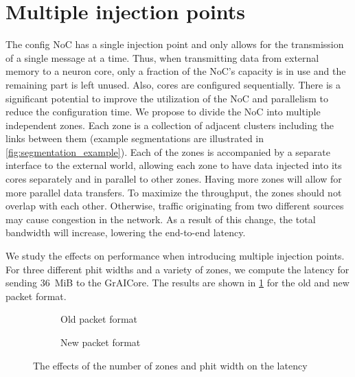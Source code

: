 \section{Multiple injection points}
The config NoC has a single injection point and only allows for the transmission of a single message at a time.
Thus, when transmitting data from external memory to a neuron core, only a fraction of the NoC's capacity is in use and the remaining part  is left unused.
Also, cores are configured sequentially.
There is a significant potential to improve the utilization of the NoC and parallelism to reduce the configuration time.
We propose to divide the NoC into multiple independent zones.
Each zone is a collection of adjacent clusters including the links between them (example segmentations are illustrated in \cref{fig:segmentation_example}).
Each of the zones is accompanied by a separate interface to the external world, allowing each zone to have data injected into its cores separately and in parallel to other zones.
Having more zones will allow for more parallel data transfers.
To maximize the throughput, the zones should not overlap with each other.
Otherwise, traffic originating from two different sources may cause congestion in the network. 
As a result of this change, the total bandwidth will increase, lowering the end-to-end latency.

We study the effects on performance when introducing multiple injection points.
For three different phit widths and a variety of zones, we compute the latency for sending \SI{36}{MiB} to the GrAICore.
The results are shown in \cref{fig:zones_vs_latency_vs_phit_width} for the old and new packet format.

\begin{figure}[htbp]
    \centering
    \begin{subfigure}[b]{0.48\textwidth}
        \begin{adjustbox}{width=\linewidth}
            
        \end{adjustbox}
        \caption{Old packet format}
    \end{subfigure}
    \hfill
    \begin{subfigure}[b]{0.48\textwidth}
        \begin{adjustbox}{width=\linewidth}
            
        \end{adjustbox}
        \caption{New packet format}
    \end{subfigure}
    \caption[]{The effects of the number of zones and phit width on the latency}
    \label{fig:zones_vs_latency_vs_phit_width}
\end{figure}


